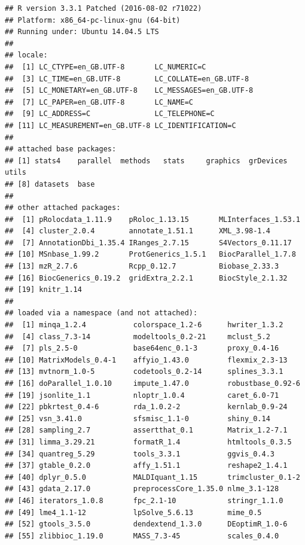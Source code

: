 \begin{verbatim}
## R version 3.3.1 Patched (2016-08-02 r71022)
## Platform: x86_64-pc-linux-gnu (64-bit)
## Running under: Ubuntu 14.04.5 LTS
## 
## locale:
##  [1] LC_CTYPE=en_GB.UTF-8       LC_NUMERIC=C              
##  [3] LC_TIME=en_GB.UTF-8        LC_COLLATE=en_GB.UTF-8    
##  [5] LC_MONETARY=en_GB.UTF-8    LC_MESSAGES=en_GB.UTF-8   
##  [7] LC_PAPER=en_GB.UTF-8       LC_NAME=C                 
##  [9] LC_ADDRESS=C               LC_TELEPHONE=C            
## [11] LC_MEASUREMENT=en_GB.UTF-8 LC_IDENTIFICATION=C       
## 
## attached base packages:
## [1] stats4    parallel  methods   stats     graphics  grDevices utils    
## [8] datasets  base     
## 
## other attached packages:
##  [1] pRolocdata_1.11.9    pRoloc_1.13.15       MLInterfaces_1.53.1 
##  [4] cluster_2.0.4        annotate_1.51.1      XML_3.98-1.4        
##  [7] AnnotationDbi_1.35.4 IRanges_2.7.15       S4Vectors_0.11.17   
## [10] MSnbase_1.99.2       ProtGenerics_1.5.1   BiocParallel_1.7.8  
## [13] mzR_2.7.6            Rcpp_0.12.7          Biobase_2.33.3      
## [16] BiocGenerics_0.19.2  gridExtra_2.2.1      BiocStyle_2.1.32    
## [19] knitr_1.14          
## 
## loaded via a namespace (and not attached):
##  [1] minqa_1.2.4           colorspace_1.2-6      hwriter_1.3.2        
##  [4] class_7.3-14          modeltools_0.2-21     mclust_5.2           
##  [7] pls_2.5-0             base64enc_0.1-3       proxy_0.4-16         
## [10] MatrixModels_0.4-1    affyio_1.43.0         flexmix_2.3-13       
## [13] mvtnorm_1.0-5         codetools_0.2-14      splines_3.3.1        
## [16] doParallel_1.0.10     impute_1.47.0         robustbase_0.92-6    
## [19] jsonlite_1.1          nloptr_1.0.4          caret_6.0-71         
## [22] pbkrtest_0.4-6        rda_1.0.2-2           kernlab_0.9-24       
## [25] vsn_3.41.0            sfsmisc_1.1-0         shiny_0.14           
## [28] sampling_2.7          assertthat_0.1        Matrix_1.2-7.1       
## [31] limma_3.29.21         formatR_1.4           htmltools_0.3.5      
## [34] quantreg_5.29         tools_3.3.1           ggvis_0.4.3          
## [37] gtable_0.2.0          affy_1.51.1           reshape2_1.4.1       
## [40] dplyr_0.5.0           MALDIquant_1.15       trimcluster_0.1-2    
## [43] gdata_2.17.0          preprocessCore_1.35.0 nlme_3.1-128         
## [46] iterators_1.0.8       fpc_2.1-10            stringr_1.1.0        
## [49] lme4_1.1-12           lpSolve_5.6.13        mime_0.5             
## [52] gtools_3.5.0          dendextend_1.3.0      DEoptimR_1.0-6       
## [55] zlibbioc_1.19.0       MASS_7.3-45           scales_0.4.0         

\end{verbatim}
